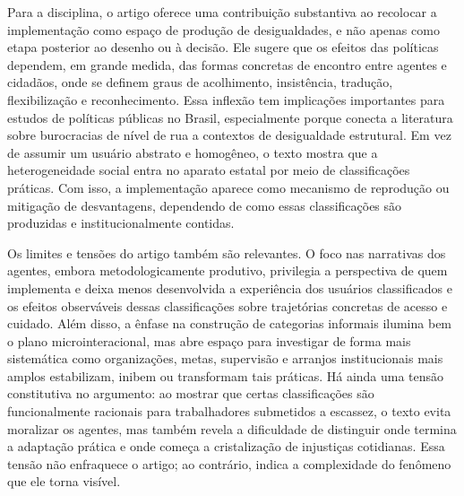 \documentclass[12pt,a4paper]{article}
\begin{document}
Para a disciplina, o artigo oferece uma contribuição substantiva ao recolocar a implementação como espaço de produção de desigualdades, e não apenas como etapa posterior ao desenho ou à decisão. Ele sugere que os efeitos das políticas dependem, em grande medida, das formas concretas de encontro entre agentes e cidadãos, onde se definem graus de acolhimento, insistência, tradução, flexibilização e reconhecimento. Essa inflexão tem implicações importantes para estudos de políticas públicas no Brasil, especialmente porque conecta a literatura sobre burocracias de nível de rua a contextos de desigualdade estrutural. Em vez de assumir um usuário abstrato e homogêneo, o texto mostra que a heterogeneidade social entra no aparato estatal por meio de classificações práticas. Com isso, a implementação aparece como mecanismo de reprodução ou mitigação de desvantagens, dependendo de como essas classificações são produzidas e institucionalmente contidas. \parencite{lotta2020_categorizando_usuarios}

Os limites e tensões do artigo também são relevantes. O foco nas narrativas dos agentes, embora metodologicamente produtivo, privilegia a perspectiva de quem implementa e deixa menos desenvolvida a experiência dos usuários classificados e os efeitos observáveis dessas classificações sobre trajetórias concretas de acesso e cuidado. Além disso, a ênfase na construção de categorias informais ilumina bem o plano microinteracional, mas abre espaço para investigar de forma mais sistemática como organizações, metas, supervisão e arranjos institucionais mais amplos estabilizam, inibem ou transformam tais práticas. Há ainda uma tensão constitutiva no argumento: ao mostrar que certas classificações são funcionalmente racionais para trabalhadores submetidos a escassez, o texto evita moralizar os agentes, mas também revela a dificuldade de distinguir onde termina a adaptação prática e onde começa a cristalização de injustiças cotidianas. Essa tensão não enfraquece o artigo; ao contrário, indica a complexidade do fenômeno que ele torna visível. \parencite{lotta2020_categorizando_usuarios}
\end{document}
